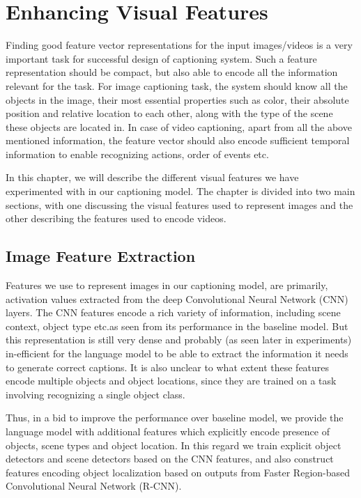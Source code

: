\chapter{Enhancing Visual Features}
\label{chapter:VisFeatChapter}

Finding good feature vector representations for the input images/videos is a
very important task for successful design of captioning system.
Such a feature representation should be compact, but also able to encode all the
information relevant for the task. 
For image captioning task, the system should know all the objects in the image,
their most essential properties such as color, their absolute position and
relative location to each other, along with the type of the scene these objects
are located in.
In case of video captioning, apart from all the above mentioned information, the
feature vector should also encode sufficient temporal information to enable
recognizing actions, order of events etc.

In this chapter, we will describe the different visual features we have experimented with
in our captioning model.
The chapter is divided into two main sections, with one discussing the visual
features used to represent images and the other describing the features used to
encode videos.

\section{Image Feature Extraction}
\label{sec:ImageFeat}

Features we use to represent images in our captioning model, are primarily,
activation values extracted from the deep Convolutional Neural Network (CNN)
layers.
The CNN features encode a rich variety of information, including scene context,
object type etc.\@ as seen from its performance in the baseline model.
But this representation is still very dense and probably (as seen later in
experiments) in-efficient for the language model to be able to extract the
information it needs to generate correct captions.
It is also unclear to what extent these features encode multiple objects and
object locations, since they are trained on a task involving recognizing a
single object class.

Thus, in a bid to improve the performance over baseline model, we provide the
language model with additional features which explicitly encode presence of
objects, scene types and object location.
In this regard we train explicit object detectors and scene detectors based on
the CNN features, and also construct features encoding object localization based
on outputs from Faster Region-based Convolutional Neural Network (R-CNN).
